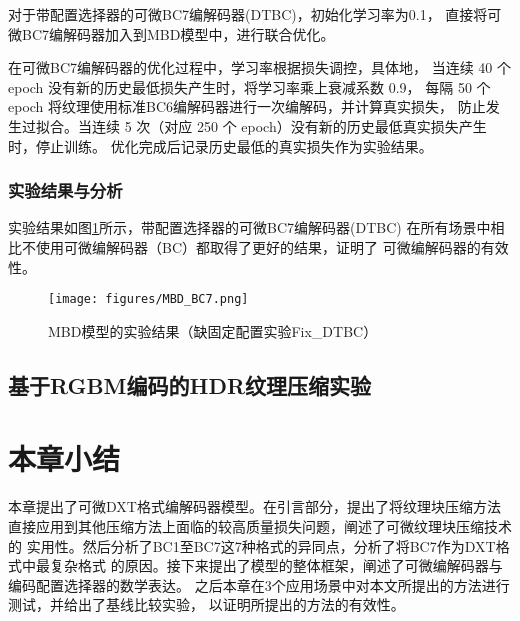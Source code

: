对于带配置选择器的可微BC7编解码器(DTBC)，初始化学习率为0.1，
直接将可微BC7编解码器加入到MBD模型中，进行联合优化。

在可微BC7编解码器的优化过程中，学习率根据损失调控，具体地，
当连续 40 个 epoch 没有新的历史最低损失产生时，将学习率乘上衰减系数 0.9，
每隔 50 个 epoch 将纹理使用标准BC6编解码器进行一次编解码，并计算真实损失，
防止发生过拟合。当连续 5 次（对应 250 个 epoch）没有新的历史最低真实损失产生时，停止训练。
优化完成后记录历史最低的真实损失作为实验结果。

\subsubsection{实验结果与分析}

实验结果如图\ref{fig:MBD_BC7}所示，带配置选择器的可微BC7编解码器(DTBC)
在所有场景中相比不使用可微编解码器（BC）都取得了更好的结果，证明了
可微编解码器的有效性。

\begin{figure}[htbp]
    \centering
    \texttt{[image: figures/MBD\_BC7.png]}
    \caption{MBD模型的实验结果（缺固定配置实验Fix\_DTBC）}
    \label{fig:MBD_BC7}
\end{figure}

\subsection{基于RGBM编码的HDR纹理压缩实验}

\section{本章小结}

本章提出了可微DXT格式编解码器模型。在引言部分，提出了将纹理块压缩方法
直接应用到其他压缩方法上面临的较高质量损失问题，阐述了可微纹理块压缩技术的
实用性。然后分析了BC1至BC7这7种格式的异同点，分析了将BC7作为DXT格式中最复杂格式
的原因。接下来提出了模型的整体框架，阐述了可微编解码器与编码配置选择器的数学表达。
之后本章在3个应用场景中对本文所提出的方法进行测试，并给出了基线比较实验，
以证明所提出的方法的有效性。


